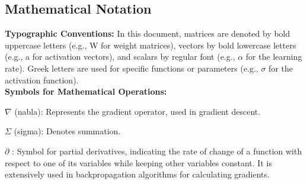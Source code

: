 \documentclass[12pt]{article}
\begin{document}

\subsection{Mathematical Notation}


\begin{inparaitem}
\textbf{Typographic Conventions:} In this document, matrices are denoted by bold uppercase letters 
(e.g., W for weight matrices), vectors by bold lowercase letters (e.g., a for activation vectors), 
and scalars by regular font (e.g., $\alpha$ for the learning rate). Greek letters are used for specific 
functions or parameters (e.g., $\sigma$ for the activation function).
\\ 
\textbf{Symbols for Mathematical Operations:}

\begin{inparaitem}
\item $\nabla$ (nabla): Represents the gradient operator, used in gradient descent.

\item $\Sigma$ (sigma): Denotes summation.

\item $\partial$ : Symbol for partial derivatives, indicating the rate of change of a function with respect to one 
of its variables while keeping other variables constant. It is extensively used in backpropagation 
algorithms for calculating gradients.
\end{inparaitem}
\end{inparaitem}

\newpage


\end{document}
